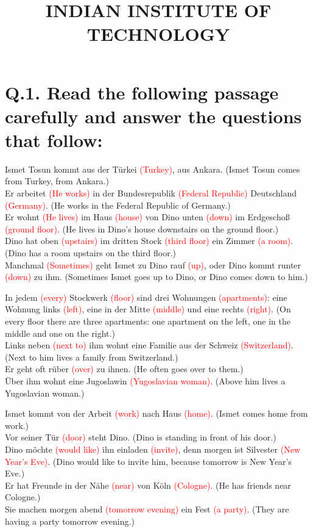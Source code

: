 \documentclass{article}
\title{
INDIAN INSTITUTE OF TECHNOLOGY
}
\date{}
\begin{document}
\maketitle

\section*{Q.1. Read the following passage carefully and answer the questions that follow:}

Ismet Tosun kommt aus der Türkei \textcolor{red}{(Turkey)}, aus Ankara. (Ismet Tosun comes from Turkey, from Ankara.)\\
Er arbeitet \textcolor{red}{(He works)} in der Bundesrepublik \textcolor{red}{(Federal Republic)} Deutschland \textcolor{red}{(Germany)}. (He works in the Federal Republic of Germany.)\\
Er wohnt \textcolor{red}{(He lives)} im Haus \textcolor{red}{(house)} von Dino unten \textcolor{red}{(down)} im Erdgeschoß \textcolor{red}{(ground floor)}. (He lives in Dino's house downstairs on the ground floor.)\\
Dino hat oben \textcolor{red}{(upstairs)} im dritten Stock \textcolor{red}{(third floor)} ein Zimmer \textcolor{red}{(a room)}. (Dino has a room upstairs on the third floor.)\\
Manchmal \textcolor{red}{(Sometimes)} geht Ismet zu Dino rauf \textcolor{red}{(up)}, oder Dino kommt runter \textcolor{red}{(down)} zu ihm. (Sometimes Ismet goes up to Dino, or Dino comes down to him.)

In jedem \textcolor{red}{(every)} Stockwerk \textcolor{red}{(floor)} sind drei Wohnungen \textcolor{red}{(apartments)}: eine Wohnung links \textcolor{red}{(left)}, eine in der Mitte \textcolor{red}{(middle)} und eine rechts \textcolor{red}{(right)}. (On every floor there are three apartments: one apartment on the left, one in the middle and one on the right.)\\
Links neben \textcolor{red}{(next to)} ihm wohnt eine Familie aus der Schweiz \textcolor{red}{(Switzerland)}. (Next to him lives a family from Switzerland.)\\
Er geht oft rüber \textcolor{red}{(over)} zu ihnen. (He often goes over to them.)\\
Über ihm wohnt eine Jugoslawin \textcolor{red}{(Yugoslavian woman)}. (Above him lives a Yugoslavian woman.)

Ismet kommt von der Arbeit \textcolor{red}{(work)} nach Haus \textcolor{red}{(home)}. (Ismet comes home from work.)\\
Vor seiner Tür \textcolor{red}{(door)} steht Dino. (Dino is standing in front of his door.)\\
Dino möchte \textcolor{red}{(would like)} ihn einladen \textcolor{red}{(invite)}, denn morgen ist Silvester \textcolor{red}{(New Year's Eve)}. (Dino would like to invite him, because tomorrow is New Year's Eve.)\\
Er hat Freunde in der Nähe \textcolor{red}{(near)} von Köln \textcolor{red}{(Cologne)}. (He has friends near Cologne.)\\
Sie machen morgen abend \textcolor{red}{(tomorrow evening)} ein Fest \textcolor{red}{(a party)}. (They are having a party tomorrow evening.)
\end{document}
